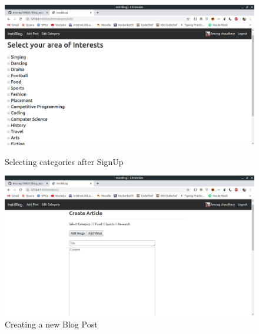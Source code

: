 \documentclass[oneside,a4paper,12pt]{article}
\begin{document}
\newpage  
\begin{figure}[h]
\centering
    \includegraphics[scale=0.2]{SS1.png}
    \caption{Selecting categories after SignUp}
   \vspace{1em}
    \includegraphics[scale=0.2]{SS2.png}
    \caption{Creating a new Blog Post}
\end{figure}
\end{document}
